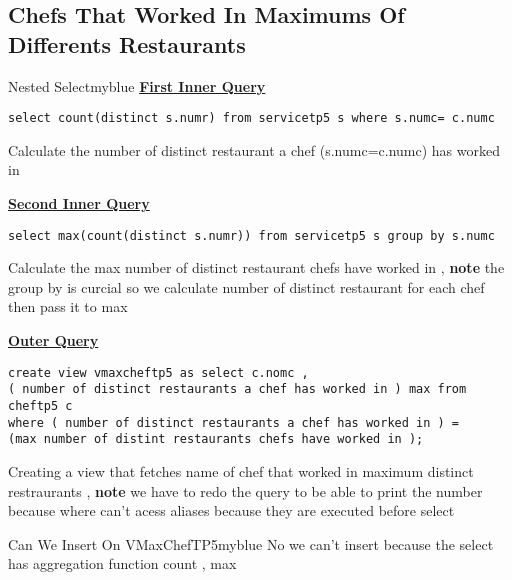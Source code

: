 \subsection*{Chefs That Worked In Maximums Of Differents Restaurants}



\begin{prettyBox}{Nested Select}{myblue}
\textbf{\underline{First Inner Query}}
\begin{lstlisting}
select count(distinct s.numr) from servicetp5 s where s.numc= c.numc
\end{lstlisting}
Calculate the number of distinct restaurant a chef (s.numc=c.numc) has worked in 

\vspace{0.15cm}

\textbf{\underline{Second Inner Query}}
\begin{lstlisting}
select max(count(distinct s.numr)) from servicetp5 s group by s.numc
\end{lstlisting}
Calculate the max number of distinct restaurant chefs have worked in , \textbf{note} the group by
is curcial so we calculate number of distinct restaurant for each chef then pass it to max 

\vspace{0.15cm}

\textbf{\underline{Outer Query}}
\begin{lstlisting}
create view vmaxcheftp5 as select c.nomc , 
( number of distinct restaurants a chef has worked in ) max from cheftp5 c 
where ( number of distinct restaurants a chef has worked in ) = 
(max number of distint restaurants chefs have worked in );
\end{lstlisting}
Creating a view that fetches name of chef that worked in maximum distinct restraurants , \textbf{note} we have to redo the query
to be able to print the number because where can't acess aliases because they are executed before select
\end{prettyBox}

\vspace{0.25cm}
\begin{prettyBox}{Can We Insert On VMaxChefTP5}{myblue}
No we can't insert because the select has aggregation function count , max
\end{prettyBox}
